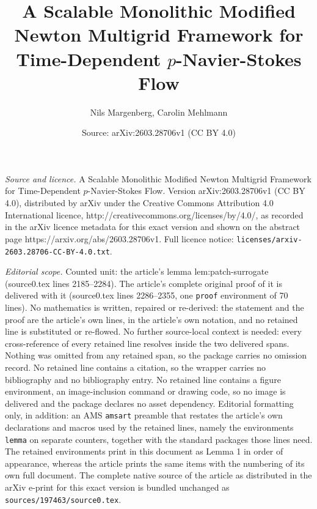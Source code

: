 \documentclass[10pt,a4paper]{amsart}
\title{A Scalable Monolithic Modified Newton Multigrid Framework for Time-Dependent $p$-Navier-Stokes Flow}
\author{Nils Margenberg, Carolin Mehlmann}
\date{Source: arXiv:2603.28706v1 (CC BY 4.0)}
\begin{document}
\maketitle

\noindent\emph{Source and licence.} A Scalable Monolithic Modified Newton Multigrid Framework for Time-Dependent $p$-Navier-Stokes Flow. Version arXiv:2603.28706v1 (CC BY 4.0), distributed by arXiv under the Creative Commons Attribution 4.0 International licence, http://creativecommons.org/licenses/by/4.0/, as recorded in the arXiv licence metadata for this exact version and shown on the abstract page https://arxiv.org/abs/2603.28706v1. Full licence notice: \texttt{licenses/arxiv-2603.28706-CC-BY-4.0.txt}.\par\smallskip

\noindent\textit{Editorial scope.} Counted unit: the article's lemma lem:patch-surrogate (source0.tex lines 2185--2284). The article's complete original proof of it is delivered with it (source0.tex lines 2286--2355, one \texttt{proof} environment of 70 lines). No mathematics is written, repaired or re-derived: the statement and the proof are the article's own lines, in the article's own notation, and no retained line is substituted or re-flowed.  No further source-local context is needed: every cross-reference of every retained line resolves inside the two delivered spans.  Nothing was omitted from any retained span, so the package carries no omission record.  No retained line contains a citation, so the wrapper carries no bibliography and no bibliography entry.  No retained line contains a figure environment, an image-inclusion command or drawing code, so no image is delivered and the package declares no asset dependency.  Editorial formatting only, in addition: an AMS \texttt{amsart} preamble that restates the article's own declarations and macros used by the retained lines, namely the environments \texttt{lemma} on separate counters, together with the standard packages those lines need.  The retained environments print in this document as Lemma 1 in order of appearance, whereas the article prints the same items with the numbering of its own full document.  The complete native source of the article as distributed in the arXiv e-print for this exact version is bundled unchanged as \texttt{sources/197463/source0.tex}.
\end{document}
